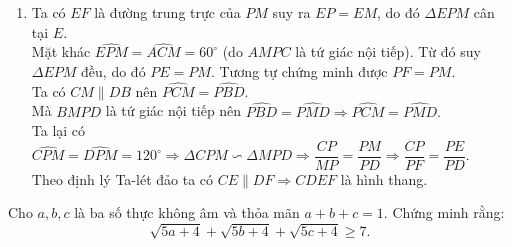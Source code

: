 \begin{ex}
{\begin{enumerate}
        Từ đó suy ra $\Delta CPM\backsim \Delta CMB \Rightarrow \dfrac{CP}{CM}=\dfrac{CM}{CB} \Rightarrow CP.CB=CM^2 \Rightarrow CM=\sqrt{CP.CB}$.\\
        Tương tự ta chứng minh được $DM=\sqrt{DP.DA}$.\\
        Vậy $\sqrt{CP.CB}+\sqrt{DP.DA}=CM+DM=AM+BM=AB.$
        \item Ta có $EF$ là đường trung trực của $PM$ suy ra $EP=EM$, do đó $\Delta EPM$ cân tại $E$.\\
        Mặt khác $\widehat{EPM}=\widehat{ACM}=60^{\circ}$ (do $AMPC$ là tứ giác nội tiếp). Từ đó suy $\Delta EPM$ đều, do đó $PE=PM$. Tương tự chứng minh được $PF=PM$.\\
        Ta có $CM\parallel DB$ nên $\widehat{PCM}=\widehat{PBD}$.\\
        Mà $BMPD$ là tứ giác nội tiếp nên $\widehat{PBD}=\widehat{PMD} \Rightarrow \widehat{PCM}=\widehat{PMD}.$\\
        Ta lại có $\widehat{CPM}=\widehat{DPM}=120^{\circ} \Rightarrow \Delta CPM\backsim \Delta MPD \Rightarrow \dfrac{CP}{MP}=\dfrac{PM}{PD} \Rightarrow \dfrac{CP}{PF}=\dfrac{PE}{PD}$.\\
        Theo định lý Ta-lét đảo ta có $CE\parallel DF\Rightarrow CDEF$ là hình thang.
\end{enumerate}
}
\end{ex}

\begin{ex}%
Cho $a, b, c$ là ba số thực không âm và thỏa mãn $a+b+c=1$. Chứng minh rằng:
$$\sqrt{5a+4}+\sqrt{5b+4}+\sqrt{5c+4}\geq 7.$$
\end{ex}


